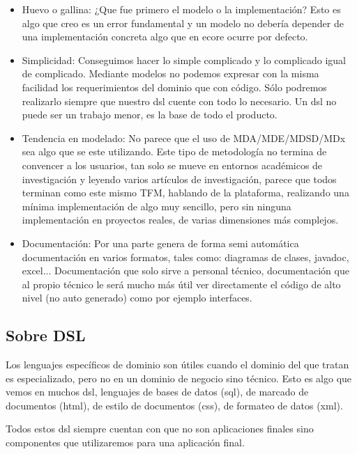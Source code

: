 \begin{itemize}
\item Huevo o gallina: ¿Que fue primero el modelo o la implementación? Esto es algo que creo es un error fundamental y un modelo no debería depender de una implementación concreta algo que en \gls{ecore} ocurre por defecto.

\item Simplicidad: Conseguimos hacer lo simple complicado y lo complicado igual de complicado. Mediante modelos no podemos expresar con la misma facilidad los requerimientos del dominio que con código. Sólo podremos realizarlo siempre que nuestro \gls{dsl} cuente con todo lo necesario. Un \gls{dsl} no puede ser un trabajo menor, es la base de todo el producto.

\item Tendencia en modelado: No parece que el uso de MDA/MDE/MDSD/MDx sea algo que se este utilizando. Este tipo de metodología no termina de convencer a los usuarios, tan solo se mueve en entornos académicos de investigación y leyendo varios artículos de investigación, parece que todos terminan como este mismo TFM, hablando de la plataforma, realizando una mínima implementación de algo muy sencillo, pero sin ninguna implementación en proyectos reales, de varias dimensiones más complejos.

\item Documentación: Por una parte genera de forma semi automática documentación en varios formatos, tales como: diagramas de clases, javadoc, excel... Documentación que solo sirve a personal técnico, documentación que al propio técnico le será mucho más útil ver directamente el código de alto nivel (no auto generado) como por ejemplo interfaces.

\end{itemize}


\subsection{Sobre DSL}

Los lenguajes específicos de dominio son útiles cuando el dominio del que tratan es especializado, pero no en un dominio de negocio sino técnico. Esto es algo que vemos en muchos \gls{dsl}, lenguajes de bases de datos (\gls{sql}), de marcado de documentos (\gls{html}), de estilo de documentos (\gls{css}), de formateo de datos (\gls{xml}).

Todos estos \gls{dsl} siempre cuentan con que no son aplicaciones finales sino componentes que utilizaremos para una aplicación final.

